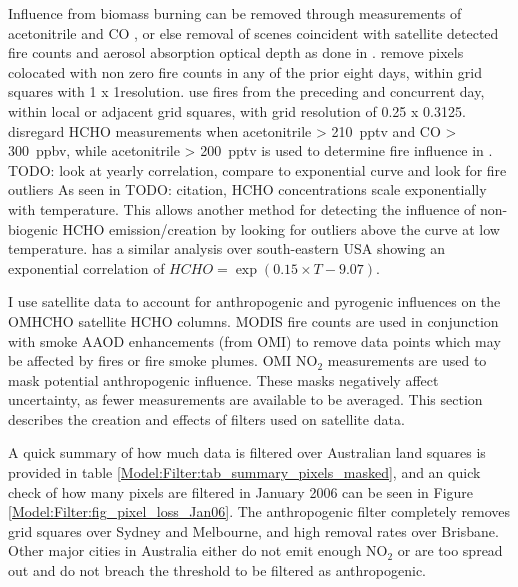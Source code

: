   Influence from biomass burning can be removed through measurements of acetonitrile and CO \parencite[eg.][]{Wolfe2016, Miller2017}, or else removal of scenes coincident with satellite detected fire counts and aerosol absorption optical depth as done in \textcite{Marais2014}.
  \textcite{Marais2012} remove pixels colocated with non zero fire counts in any of the prior eight days, within grid squares with 1 x 1\degr resolution.
  \textcite{Barkley2013} use fires from the preceding and concurrent day, within local or adjacent grid squares, with grid resolution of 0.25 x 0.3125\degr.
  \textcite{Wolfe2016} disregard HCHO measurements when acetonitrile > 210~pptv and CO > 300~ppbv, while acetonitrile > 200~pptv is used to determine fire influence in \textcite{Miller2017}.
  TODO: look at yearly correlation, compare to exponential curve and look for fire outliers
  As seen in TODO: citation, HCHO concentrations scale exponentially with temperature.
  This allows another method for detecting the influence of non-biogenic HCHO emission/creation by looking for outliers above the curve at low temperature.
  \textcite{Zhu2013_poster} has a similar analysis over south-eastern USA showing an exponential correlation of ${HCHO} = \exp(0.15\times{T}-9.07)$.
  
  I use satellite data to account for anthropogenic and pyrogenic influences on the OMHCHO satellite HCHO columns.
  MODIS fire counts are used in conjunction with smoke AAOD enhancements (from OMI) to remove data points which may be affected by fires or fire smoke plumes.
  OMI NO$_2$ measurements are used to mask potential anthropogenic influence.  
  These masks negatively affect uncertainty,  as fewer measurements are available to be averaged.
  This section describes the creation and effects of filters used on satellite data.
  
  A quick summary of how much data is filtered over Australian land squares is provided in table \ref{Model:Filter:tab_summary_pixels_masked}, and an quick check of how many pixels are filtered in January 2006 can be seen in Figure \ref{Model:Filter:fig_pixel_loss_Jan06}.
  The anthropogenic filter completely removes grid squares over Sydney and Melbourne, and high removal rates over Brisbane. 
  Other major cities in Australia either do not emit enough NO$_2$ or are too spread out and do not breach the threshold to be filtered as anthropogenic.
  
